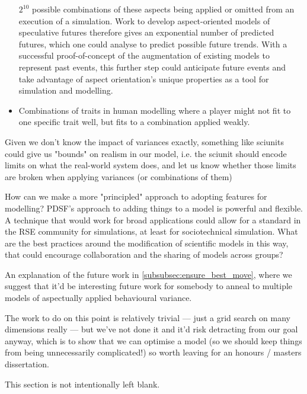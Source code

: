 \begin{itemize}
    \(2^{10}\) possible combinations of these aspects being applied or omitted
    from an execution of a simulation. Work to develop aspect-oriented models of
    speculative futures therefore gives an exponential number of predicted
    futures, which one could analyse to predict possible future trends. With a
    successful proof-of-concept of the augmentation of existing models to
    represent past events, this further step could anticipate future events and
    take advantage of aspect orientation's unique properties as a tool for
    simulation and modelling.
    \item Combinations of traits in human modelling where a player might not fit
    to one specific trait well, but fits to a combination applied weakly.
\end{itemize}



Given we don't know the impact of variances exactly, something like sciunits
could give us "bounds" on realism in our model, i.e. the sciunit should encode
limits on what the real-world system does, and let us know whether those limits
are broken when applying variances (or combinations of them)


How can we make a more "principled" approach to adopting features for modelling?
PDSF's approach to adding things to a model is powerful and flexible. A
technique that would work for broad applications could allow for a standard in
the RSE community for simulations, at least for sociotechnical simulation. What
are the best practices around the modification of scientific models in this way,
that could encourage collaboration and the sharing of models across groups?


An explanation of the future work in \cref{subsubsec:ensure_best_move}, where we
suggest that it'd be interesting future work for somebody to anneal to multiple
models of aspectually applied behavioural variance. 

The work to do on this point is relatively trivial --- just a grid search on
many dimensions really --- but we've not done it and it'd risk detracting from
our goal anyway, which is to show that we can optimise a model (so we should
keep things from being unnecessarily complicated!) so worth leaving for an
honours / masters dissertation.


This section is not intentionally left blank.

